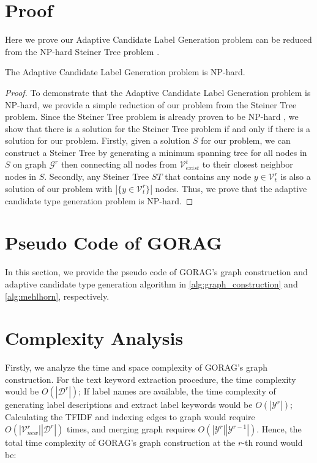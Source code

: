 \section{Proof}
\label{sec:proof}
Here we prove our Adaptive Candidate Label Generation problem can be reduced from the NP-hard Steiner Tree problem \cite{Su2020}.
\begin{theorem}
	The Adaptive Candidate Label Generation problem is NP-hard. 
\end{theorem}
\begin{proof}
	
		To demonstrate that the Adaptive Candidate Label Generation problem is NP-hard, we provide a simple reduction of our problem from the Steiner Tree problem. Since the Steiner Tree problem is already proven to be NP-hard \cite{Su2020}, we show that there is a solution for the Steiner Tree problem if and only if there is a solution for our problem. Firstly, given a solution $S$ for our problem, we can construct a Steiner Tree by generating a minimum spanning tree for all nodes in $S$ on graph $\mathcal{G}^r$ then connecting all nodes from $\mathcal{V}_{exist}^t$ to their closest neighbor nodes in $S$. Secondly, any Steiner Tree $ST$ that contains any node $y\in\mathcal{V}^r_t$ is also a solution of our problem with $|\{y\in\mathcal{V}^r_t\}|$ nodes.
		Thus, we prove that the adaptive candidate type generation problem is NP-hard. 
		
\end{proof}	


\section{Pseudo Code of GORAG}
\label{sec:pseduo_code}
In this section, we provide the pseudo code of GORAG's graph construction and adaptive candidate type generation algorithm in \autoref{alg:graph_construction} and \autoref{alg:mehlhorn}, respectively. 

\section{Complexity Analysis}
\label{sec:complexity}

Firstly, we analyze the time and space complexity of GORAG's graph construction. For the text keyword extraction procedure, the time complexity would be $O(|\mathcal{D}^r|)$; If label names are available, the time complexity of generating label descriptions and extract label keywords would be $O(|\mathcal{Y}^r|)$; Calculating the TFIDF and indexing edges to graph would require $O(|\mathcal{V}_{new}^r||\mathcal{D}^r|)$ times, and merging graph requires $O(|\mathcal{Y}^r||\mathcal{Y}^{r-1}|)$. Hence, the total time complexity of GORAG's graph construction at the $r$-th round would be: 

